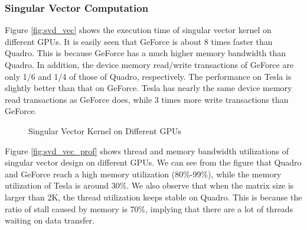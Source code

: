 \subsubsection{Singular Vector Computation}
Figure \ref{fig:svd_vec} shows the execution time of singular vector kernel on different GPUs. 
It is easily seen that GeForce is about 8 times faster than
Quadro. This is because GeForce has a much higher memory bandwidth
than Quadro.
In addition, the device memory read/write transactions of GeForce are only 1/6 and 1/4 of those of Quadro, respectively.
The performance on Tesla is slightly better than that on GeForce.
Tesla has nearly the same device memory read transactions as GeForce does, while 3 times more write transactions than GeForce.

\begin{figure}[hbpt]
\vspace{-0.3in}
\centering
\vspace{-0.1in}
  \caption{Singular Vector Kernel on Different GPUs}
  \label{fig:svdvec}
\vspace{-0.3in}
\end{figure}

Figure \ref{fig:svd_vec_prof} shows thread and memory bandwidth utilizations of singular vector design on different GPUs. 
We can see from the figure that Quadro and GeForce reach a high memory utilization (80\%-99\%), while the memory utilization of Tesla is around 30\%. 
We also observe that when the matrix size is larger than 2K, the thread utilization keeps stable on Quadro. 
This is because the ratio of stall caused by memory is 70\%, implying that there are a lot of threads waiting on data transfer.

\vspace{-0.1in}
